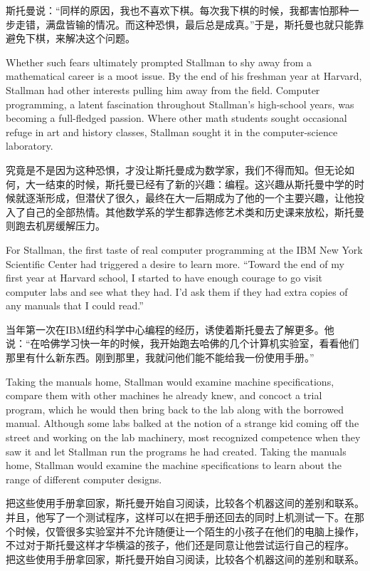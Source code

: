\ifdefined\chs
斯托曼说：``同样的原因，我也不喜欢下棋。每次我下棋的时候，我都害怕那种一步走错，满盘皆输的情况。而这种恐惧，最后总是成真。''\ifdefined\vtwo 于是，斯托曼也就只能靠避免下棋，来解决这个问题。\fi
\fi

\ifdefined\eng
Whether such fears ultimately prompted Stallman to shy away from a mathematical career is a moot issue. By the end of his freshman year at Harvard, Stallman had other interests pulling him away from the field. Computer programming, a latent fascination throughout Stallman's high-school years, was becoming a full-fledged passion. Where other math students sought occasional refuge in art and history classes, Stallman sought it in the computer-science laboratory.
\fi

\ifdefined\chs
究竟是不是因为这种恐惧，才没让斯托曼成为数学家，我们不得而知。但无论如何，大一结束的时候，斯托曼已经有了新的兴趣：编程。这兴趣从斯托曼中学的时候就逐渐形成，但潜伏了很久，最终在大一后期成为了他的一个主要兴趣，让他投入了自己的全部热情。其他数学系的学生都靠选修艺术类和历史课来放松，斯托曼则跑去机房缓解压力。
\fi

\ifdefined\eng
For Stallman, the first taste of real computer programming at the IBM New York Scientific Center had triggered a desire to learn more. ``Toward the end of my first year at Harvard school, I started to have enough courage to go visit computer labs and see what they had. I'd ask them if they had extra copies of any manuals that I could read.'' 
\fi

\ifdefined\chs
当年第一次在IBM纽约科学中心编程的经历，诱使着斯托曼去了解更多。他说：``在哈佛学习快一年的时候，我开始跑去哈佛的几个计算机实验室，看看他们那里有什么新东西。刚到那里，我就问他们能不能给我一份使用手册。''
\fi

\ifdefined\eng
\ifdefined\vone
Taking the manuals home, Stallman would examine machine specifications, compare them with other machines he already knew, and concoct a trial program, which he would then bring back to the lab along with the borrowed manual. Although some labs balked at the notion of a strange kid coming off the street and working on the lab machinery, most recognized competence when they saw it and let Stallman run the programs he had created.
\fi
\ifdefined\vtwo
Taking the manuals home, Stallman would examine the machine specifications to learn about the range of different computer designs.
\fi
\fi

\ifdefined\chs
\ifdefined\vone
把这些使用手册拿回家，斯托曼开始自习阅读，比较各个机器这间的差别和联系。并且，他写了一个测试程序，这样可以在把手册还回去的同时上机测试一下。在那个时候，仅管很多实验室并不允许随便让一个陌生的小孩子在他们的电脑上操作，不过对于斯托曼这样才华横溢的孩子，他们还是同意让他尝试运行自己的程序。
\fi
\ifdefined\vtwo
把这些使用手册拿回家，斯托曼开始自习阅读，比较各个机器这间的差别和联系。
\fi
\fi

